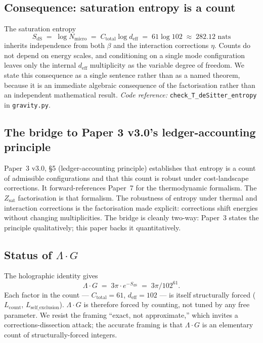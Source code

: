 \documentclass[11pt]{article}
\newcommand{\coderef}[2]{\smallskip\noindent\textit{Code reference:} \texttt{#1} in \texttt{#2}.}
\theoremstyle{definition}
\begin{document}
\subsection{Consequence: saturation entropy is a count}
The saturation entropy
\[
S_{\mathrm{dS}} \;=\; \log N_{\mathrm{micro}} \;=\; C_{\mathrm{total}} \log d_{\mathrm{eff}} \;=\; 61 \log 102 \;\approx\; 282.12 \text{ nats}
\]
inherits independence from both $\beta$ and the interaction corrections $\eta$.  Counts do not depend on energy scales, and conditioning on a single mode configuration leaves only the internal $d_{\mathrm{eff}}$ multiplicity as the variable degree of freedom.  We state this consequence as a single sentence rather than as a named theorem, because it is an immediate algebraic consequence of the factorisation rather than an independent mathematical result.
\coderef{check\_T\_deSitter\_entropy}{gravity.py}

\subsection{The bridge to Paper 3 v3.0's ledger-accounting principle}
Paper~3 v3.0, \S 5 (ledger-accounting principle) establishes that entropy is a count of admissible configurations and that this count is robust under cost-landscape corrections.  It forward-references Paper~7 for the thermodynamic formalism.  The $Z_{\mathrm{sat}}$ factorisation is that formalism.  The robustness of entropy under thermal and interaction corrections is the factorisation made explicit: corrections shift energies without changing multiplicities.  The bridge is cleanly two-way: Paper~3 states the principle qualitatively; this paper backs it quantitatively.

\subsection{Status of $\Lambda \cdot G$}
The holographic identity gives
\[
\Lambda \cdot G \;=\; 3\pi \cdot e^{-S_{\mathrm{dS}}} \;=\; 3\pi / 102^{61}.
\]
Each factor in the count --- $C_{\mathrm{total}} = 61$, $d_{\mathrm{eff}} = 102$ --- is itself structurally forced ($L_{\mathrm{count}}$, $L_{\mathrm{self\_exclusion}}$).  $\Lambda \cdot G$ is therefore forced by counting, not tuned by any free parameter.  We resist the framing ``exact, not approximate,'' which invites a corrections-dissection attack; the accurate framing is that $\Lambda \cdot G$ is an elementary count of structurally-forced integers.

\end{document}
